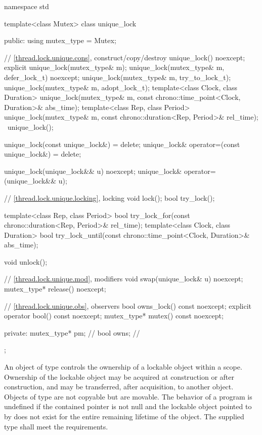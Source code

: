 %
\begin{codeblock}
namespace std {
  template<class Mutex>
  class unique_lock {
  public:
    using mutex_type = Mutex;

    // \ref{thread.lock.unique.cons}, construct/copy/destroy
    unique_lock() noexcept;
    explicit unique_lock(mutex_type& m);
    unique_lock(mutex_type& m, defer_lock_t) noexcept;
    unique_lock(mutex_type& m, try_to_lock_t);
    unique_lock(mutex_type& m, adopt_lock_t);
    template<class Clock, class Duration>
      unique_lock(mutex_type& m, const chrono::time_point<Clock, Duration>& abs_time);
    template<class Rep, class Period>
      unique_lock(mutex_type& m, const chrono::duration<Rep, Period>& rel_time);
    ~unique_lock();

    unique_lock(const unique_lock&) = delete;
    unique_lock& operator=(const unique_lock&) = delete;

    unique_lock(unique_lock&& u) noexcept;
    unique_lock& operator=(unique_lock&& u);

    // \ref{thread.lock.unique.locking}, locking
    void lock();
    bool try_lock();

    template<class Rep, class Period>
      bool try_lock_for(const chrono::duration<Rep, Period>& rel_time);
    template<class Clock, class Duration>
      bool try_lock_until(const chrono::time_point<Clock, Duration>& abs_time);

    void unlock();

    // \ref{thread.lock.unique.mod}, modifiers
    void swap(unique_lock& u) noexcept;
    mutex_type* release() noexcept;

    // \ref{thread.lock.unique.obs}, observers
    bool owns_lock() const noexcept;
    explicit operator bool() const noexcept;
    mutex_type* mutex() const noexcept;

  private:
    mutex_type* pm;             // \expos
    bool owns;                  // \expos
  };
}
\end{codeblock}

\pnum
An object of type  controls the ownership of a lockable
object within a scope. Ownership of the lockable object may be acquired at
construction or after construction, and may be transferred, after
acquisition, to another  object. Objects of type  are not
copyable but are movable. The behavior of a program is undefined if the contained pointer
 is not null and the lockable object pointed
to by  does not exist for the entire remaining
lifetime of the  object. The supplied
 type shall meet the 
requirements.

